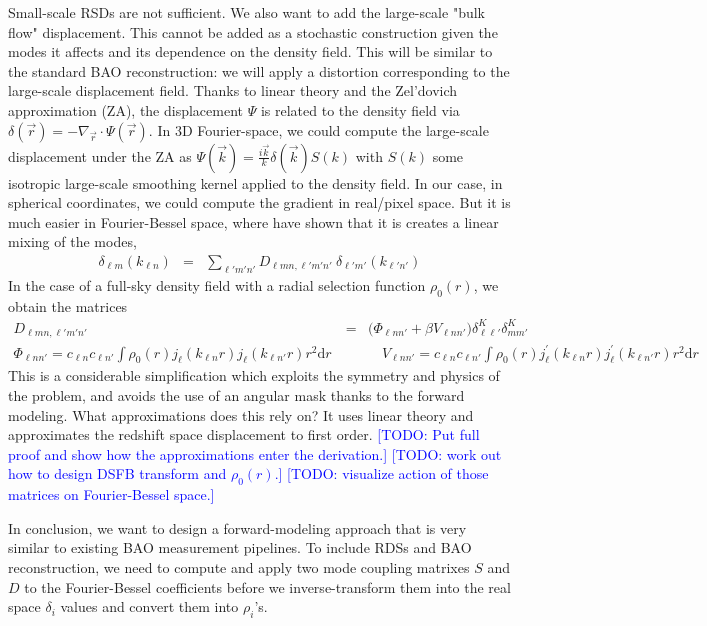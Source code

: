 \documentclass{aastex6}
\renewcommand{\d}{{\mathrm{d}}}
\newcommand{\eqn}[1]{\begin{eqnarray}#1\end{eqnarray}}
\newcommand{\todo}[1]{\textcolor{blue}{[TODO: #1]}}
\begin{document}
Small-scale RSDs are not sufficient. 
We also want to add the large-scale "bulk flow" displacement. 
This cannot be added as a stochastic construction given the modes it affects and its dependence on the density field.
This will be similar to the standard BAO reconstruction: we will apply a distortion corresponding to the large-scale displacement field. 
Thanks to linear theory and the Zel'dovich approximation (ZA), the displacement $\Psi$ is related to the density field via $\delta(\vec{r}) = -\nabla_{\vec{r}} \cdot \Psi(\vec{r})$. 
In 3D Fourier-space, we could compute the large-scale displacement under the ZA as $\Psi(\vec{k}) = \frac{i\vec{k}}{k} \delta(\vec{k}) S(k)$ with $S(k)$ some isotropic large-scale smoothing kernel applied to the density field.
In our case, in spherical coordinates, we could compute the gradient in real/pixel space. 
But it is much easier in Fourier-Bessel space, where \cite{Heavens1995} have shown that it is creates a linear mixing of the modes,
\eqn{
	\delta_{\ell m}(k_{\ell n}) &=& \sum_{\ell'm'n'} D_{\ell m n, \ell' m' n'}\ \delta_{\ell' m'}(k_{\ell' n'}) 	
} 
In the case of a full-sky density field with a radial selection function $\rho_0(r)$, we obtain the matrices
\eqn{
	D_{\ell m n, \ell' m' n'} &=& \bigl( \Phi_{\ell nn'} + \beta V_{\ell nn'} \bigr) \delta^K_{\ell \ell'}\delta^K_{m m'}	\\
	 \Phi_{\ell nn'}  =	c_{\ell n}c_{\ell n'}\int	\rho_0(r)	j_\ell(k_{\ell n}r)	j_\ell(k_{\ell n'}r) r^2 \d r	 \
	&& \quad V_{\ell nn'}  = c_{\ell n}c_{\ell n'}\int	\rho_0(r)	j^\prime_\ell(k_{\ell n}r)	j^\prime_\ell(k_{\ell n'}r) r^2 \d r	
}
This is a considerable simplification which exploits the symmetry and physics of the problem, and avoids the use of an angular mask thanks to the forward modeling.
What approximations does this rely on? 
It uses linear theory and approximates the redshift space displacement to first order.
\todo{Put full proof and show how the approximations enter the derivation.}
\todo{work out how to design DSFB transform and $\rho_0(r)$.}
\todo{visualize action of those matrices on Fourier-Bessel space.}

In conclusion, we want to design a forward-modeling approach that is very similar to existing BAO measurement pipelines. 
To include RDSs and BAO reconstruction, we need to compute and apply two mode coupling matrixes $S$ and $D$ to the Fourier-Bessel coefficients before we inverse-transform them into the real space $\delta_i$ values and convert them into $\rho_i$'s. 

\end{document}

